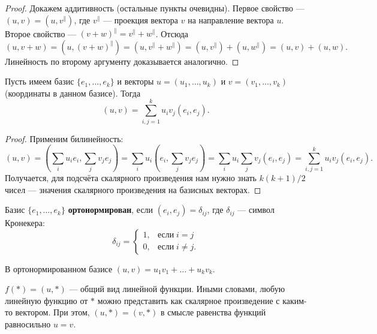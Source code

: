 \begin{proof}
    Докажем аддитивность (остальные пункты очевидны). Первое свойство --- $(u, v) = (u, v^\parallel)$, где $v^\parallel$ --- проекция вектора $v$ на направление вектора $u$. Второе свойство --- $(v + w)^\parallel = v^\parallel + w^\parallel$. Отсюда
    $$
    (u, v + w) = (u, (v + w)^\parallel) = (u, v^\parallel + w^\parallel) = (u, v^\parallel) + (u, w^\parallel) = (u, v) + (u, w).
    $$
    Линейность по второму аргументу доказывается аналогично.
\end{proof}

\begin{statement}
    Пусть имеем базис $\{e_1, \ldots, e_k\}$ и векторы $u = (u_1, \ldots, u_k)$ и $v = (v_1, \ldots, v_k)$ (координаты в данном базисе). Тогда
    $$(u, v) = \sum_{i, j = 1}^k u_iv_j(e_i, e_j). $$
\end{statement}

\begin{proof}
    Применим билинейность:
    $$
    (u, v) = \left(\sum_iu_ie_i, \sum_jv_je_j\right) = \sum_iu_i\left(e_i, \sum_jv_je_j\right) = \sum_iu_i\sum_jv_j(e_i, e_j) = \sum_{i, j = 1}^ku_iv_j(e_i, e_j).
    $$
    Получается, для подсчёта скалярного произведения нам нужно знать $k(k + 1) / 2$ чисел --- значения скалярного произведения на базисных векторах.
\end{proof}

\begin{definition}
    Базис $\{e_1, \ldots, e_k\}$ \textbf{ортонормирован}\footnotemark, если $(e_i, e_j) = \delta_{ij}$, где $\delta_{ij}$ --- символ Кронекера:
    $$\delta_{ij} = 
    \begin{cases}
        1,&\text{если}\;i = j\\
        0,&\text{если}\;i \ne j.
    \end{cases}$$
\end{definition}


\begin{orangebox}
    В ортонормированном базисе $(u, v) = u_1v_1 + \ldots + u_kv_k$.
\end{orangebox}

\begin{theorem}
    $f(\ast) = (u, \ast)$ --- общий вид линейной функции. Иными словами, любую линейную функцию от $\ast$ можно представить как скалярное произведение с каким-то вектором. При этом, $(u, \ast) = (v, \ast)$ в смысле равенства функций равносильно $u = v$.
\end{theorem}


